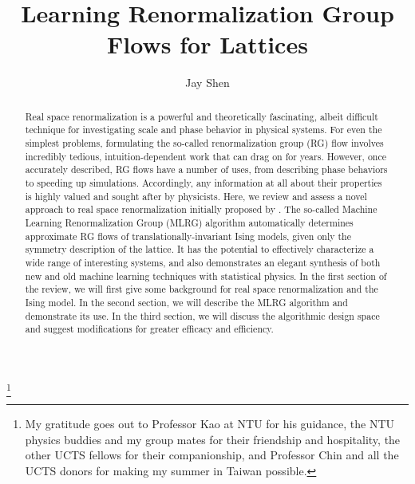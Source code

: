 \documentclass[%
    reprint,
    amsmath,amssymb,
    aps
]{revtex4-2}
\begin{document}

\title{Learning Renormalization Group Flows for Lattices}

\author{Jay Shen}
\thanks{
    My gratitude goes out to Professor Kao at NTU for his guidance, the NTU physics 
    buddies and my group mates for their friendship and hospitality, the other UCTS 
    fellows for their companionship, and Professor Chin and all the UCTS donors 
    for making my summer in Taiwan possible.
}

\begin{abstract}

    Real space renormalization is a powerful and theoretically fascinating, albeit 
    difficult technique for investigating scale and phase behavior in physical systems. 
    For even the simplest problems, formulating the so-called renormalization group 
    (RG) flow involves incredibly tedious, intuition-dependent work that can drag 
    on for years. 
    However, once accurately described, RG flows have a number of uses, from 
    describing phase behaviors to speeding up simulations. 
    Accordingly, any information at all about their properties is highly valued
    and sought after by physicists. 
    Here, we review and assess a novel approach to real space renormalization 
    initially proposed by \cite[Hou et al.][1]{}. 
    The so-called Machine Learning Renormalization Group (MLRG) algorithm 
    automatically determines approximate RG flows of translationally-invariant 
    Ising models, given only the symmetry description of the lattice. 
    It has the potential to effectively characterize a wide range of 
    interesting systems, and also demonstrates an elegant synthesis of both new 
    and old machine learning techniques with statistical physics. 
    In the first section of the review, we will first give some background for real 
    space renormalization and the Ising model. 
    In the second section, we will describe the MLRG algorithm and demonstrate 
    its use. 
    In the third section, we will discuss the algorithmic design space and suggest 
    modifications for greater efficacy and efficiency. 

\end{abstract}

\maketitle
\end{document}

